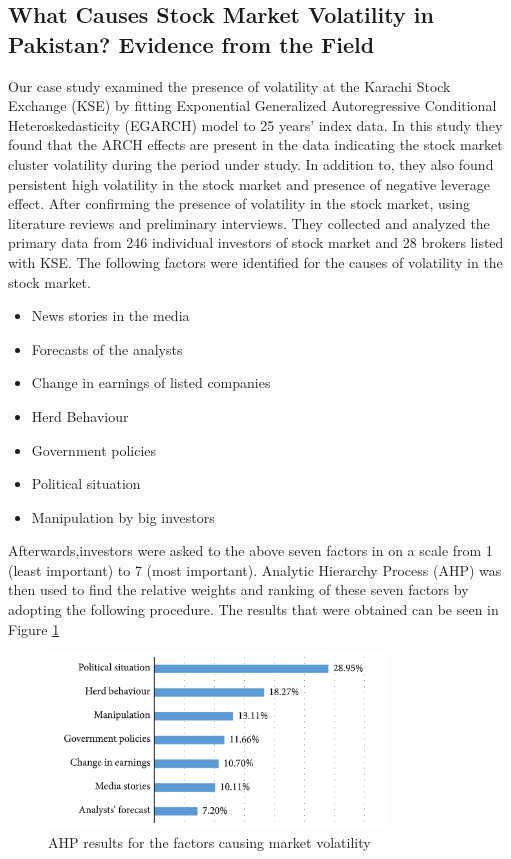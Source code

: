 \documentclass[runningheads]{llncs}
\begin{document}
\subsection{What Causes Stock Market Volatility in Pakistan? Evidence from the Field}
Our case study \cite{ref_lncs4} examined the presence of volatility at the Karachi Stock Exchange (KSE) by fitting Exponential Generalized Autoregressive Conditional Heteroskedasticity (EGARCH) model to 25 years’ index data. In this study they  found that the ARCH effects are present in the data indicating the stock market cluster volatility during the period under study. In addition to, they also found persistent high volatility in the stock market and presence of negative leverage effect. After confirming the presence of volatility in the stock market, using literature reviews and preliminary interviews. They collected and analyzed the primary data from 246 individual investors of stock market and 28 brokers listed with KSE. The following factors were identified for the causes of volatility in the stock market. 
\begin{itemize}
    \item[1.] News stories in the media
    \item[2.] Forecasts of the analysts
    \item[3.] Change in earnings of listed companies
    \item[4.] Herd Behaviour
    \item[5.] Government policies
    \item[6.] Political situation
    \item[7.] Manipulation by big investors
\end{itemize}
Afterwards,investors were asked to the above seven factors in on a scale from 1 (least important) to 7 (most important). Analytic Hierarchy Process (AHP) was then used to find the relative weights and ranking of these seven factors by adopting the following procedure. The results that were obtained can be seen in Figure \ref{fig8}
\begin{figure}[H]
    \centering
  \includegraphics[width=0.8\textwidth]{AHP.png}
    \caption{AHP results for the factors causing market volatility}
    \label{fig8}
\end{figure}
\end{document}
